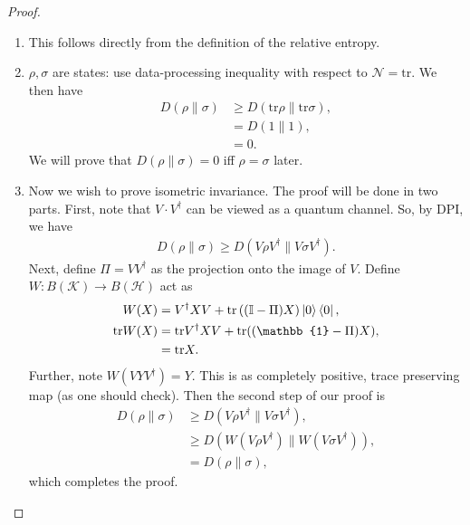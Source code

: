 \documentclass[notoc]{tufte-book}
\begin{document}
\begin{proof}
\begin{enumerate}

\item This follows directly from the definition of the relative entropy. 
\item $\rho,\sigma$ are states: use data-processing inequality with respect to $\mathcal{N} = \text{tr}$. We then have
\begin{align}
    D(\rho \| \sigma) &\geq D(\text{tr}\rho \| \text{tr}\sigma), \\
    &= D(1 \| 1), \\
    &= 0.
\end{align}
We will prove that $D(\rho \| \sigma) =0$ iff $\rho=\sigma$ later.

\item Now we wish to prove isometric invariance. The proof will be done in two parts. First, note that $V \cdot V^{\dagger}$ can be viewed as a quantum channel. So, by DPI, we have
\begin{align}
    D(\rho \| \sigma) \geq D(V\rho V^{\dagger} \| V \sigma V^{\dagger}).
\end{align}
Next, define $\Pi = V V^{\dagger}$ as the projection onto the image of $V$. Define $W: B(\mathcal{K}) \rightarrow B(\mathcal{H})$ act as
\begin{align}
    W(X) &= V^{\dagger}XV + \text{tr}\left((\mathbb{I}-\Pi) X\right) \ket{0}\bra{0}, \\
    \text{tr}W(X) &= \text{tr}V^{\dagger}XV + \text{tr}((\mathbb{1}- \Pi)X), \\
    &= \text{tr}X.
\end{align}
Further, note $W(VYV^{\dagger})=Y$. 
This is as completely positive, trace preserving map (as one should check). Then the second step of our proof is 
\begin{align}
    D(\rho \| \sigma) &\geq D(V \rho V^{\dagger} \| V\sigma V^{\dagger}),\\
    &\geq D(W(V \rho V^{\dagger})\| W(V \sigma V^{\dagger})),\\
    &= D(\rho \| \sigma),
\end{align}
which completes the proof.


\end{enumerate}
\end{proof}
\end{document}
